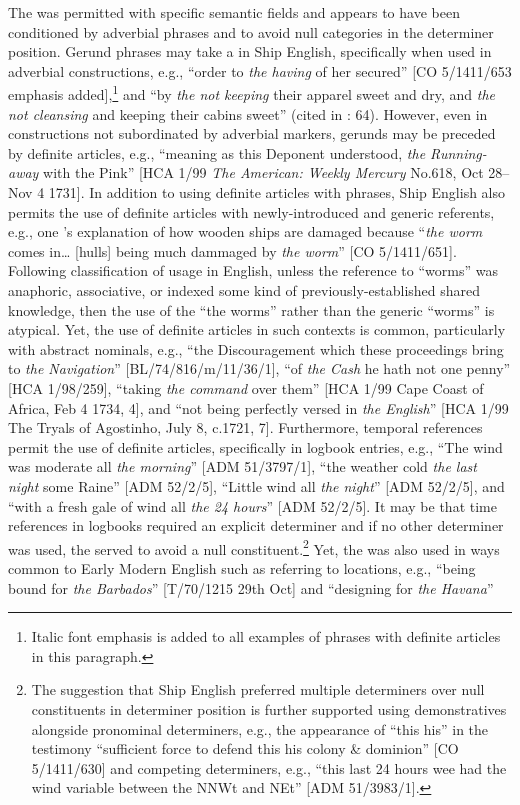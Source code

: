 The  was permitted with specific semantic fields and appears to have been conditioned by adverbial  phrases and to avoid null categories in the determiner position. Gerund phrases may take a  in Ship English, specifically when used in adverbial constructions, e.g., “order to \textit{the having} of her secured” [CO 5/1411/653 emphasis added],\footnote{Italic font emphasis is added to all examples of  phrases with definite articles in this paragraph.} and “by \textit{the not keeping} their apparel sweet and dry, and \textit{the not cleansing} and keeping their cabins sweet” (cited in \citealt{Brown2011}: 64). However, even in constructions not subordinated by adverbial markers, gerunds may be preceded by definite articles, e.g., “meaning as this Deponent understood, \textit{the Running-away} with the Pink” [HCA 1/99 \textit{The American: Weekly Mercury} No.618, Oct 28–Nov 4 1731]. In addition to using definite articles with  phrases, Ship English also permits the use of definite articles with newly-introduced and generic referents, e.g., one ’s explanation of how wooden ships are damaged because “\textit{the worm} comes in… [hulls] being much dammaged by \textit{the worm}” [CO 5/1411/651]. Following  classification of  usage in English, unless the reference to “worms” was anaphoric, associative, or indexed some kind of previously-established shared knowledge, then the use of the   “the worms” rather than the generic  “worms” is atypical. Yet, the use of definite articles in such contexts is common, particularly with abstract nominals, e.g., “the Discouragement which these proceedings bring to \textit{the Navigation}” [BL/74/816/m/11/36/1], “of \textit{the Cash} he hath not one penny” [HCA 1/98/259], “taking \textit{the command} over them” [HCA 1/99 Cape Coast of Africa, Feb 4 1734, 4], and “not being perfectly versed in \textit{the English}” [HCA 1/99 The Tryals of Agostinho, July 8, c.1721, 7]. Furthermore, temporal references permit the use of definite articles, specifically in logbook entries, e.g., “The wind was moderate all \textit{the morning}” [ADM 51/3797/1], “the weather cold \textit{the last night} some Raine” [ADM 52/2/5], “Little wind all \textit{the night}” [ADM 52/2/5], and “with a fresh gale of wind all \textit{the 24 hours}” [ADM 52/2/5]. It may be that time references in logbooks required an explicit determiner and if no other determiner was used, the  served to avoid a null constituent.\footnote{The suggestion that Ship English preferred multiple determiners over null constituents in determiner position is further supported using demonstratives alongside  pronominal determiners, e.g., the appearance of “this his” in the testimony “sufficient force to defend this his colony \& dominion” [CO 5/1411/630] and competing determiners, e.g., “this last 24 hours wee had the wind variable between the NNWt and NEt” [ADM 51/3983/1].} Yet, the  was also used in ways common to Early Modern English such as referring to locations, e.g., “being bound for \textit{the Barbados}” [T/70/1215 29th Oct] and “designing for \textit{the Havana}” 